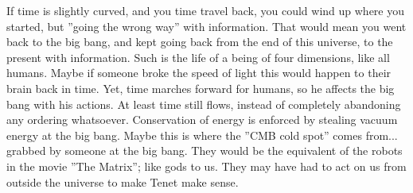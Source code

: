\documentclass{article}
\begin{document}
If time is slightly curved, and you time travel back, you could wind up where you started, but ''going the wrong way''  with information. That would mean you went back to the big bang, and kept going back from the end of this universe, to the present with information. Such is the life of a being of four dimensions, like all humans. Maybe if someone broke the speed of light this would happen to their brain back in time. Yet, time marches forward for humans, so he affects the big bang with his actions. At least time still flows, instead of completely abandoning any ordering whatsoever. Conservation of energy is enforced by stealing vacuum energy at the big bang. Maybe this is where the ''CMB cold spot'' comes from... grabbed by someone at the big bang. They would be the equivalent of the robots in the movie ''The Matrix''; like gods to us.
They may have had to act on us from outside the universe to make Tenet make sense.
\end{document}
